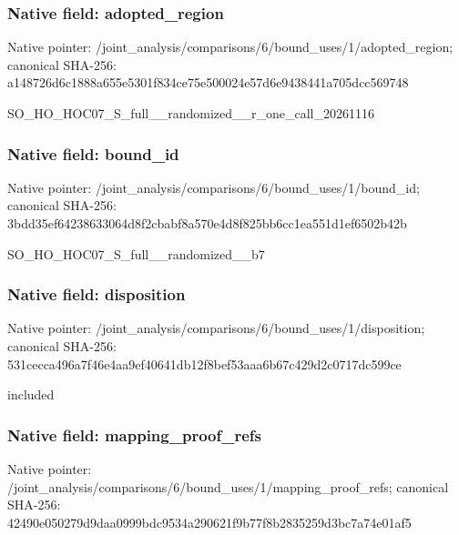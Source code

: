 \documentclass[10pt,a4paper]{article}
\begin{document}
\subsubsection{Native field: adopted\_\allowbreak{}region}
Native pointer: /joint\_\allowbreak{}analysis/comparisons/6/bound\_\allowbreak{}uses/1/adopted\_\allowbreak{}region; canonical SHA-256: a148726d6c1888a655e5301f834ce75e500024e57d6e9438441a705dcc569748

\begingroup\raggedright\sloppy SO\_\allowbreak{}HO\_\allowbreak{}HOC07\_\allowbreak{}S\_\allowbreak{}full\_\allowbreak{}\_\allowbreak{}randomized\_\allowbreak{}\_\allowbreak{}r\_\allowbreak{}one\_\allowbreak{}call\_\allowbreak{}20261116\par\endgroup

\subsubsection{Native field: bound\_\allowbreak{}id}
Native pointer: /joint\_\allowbreak{}analysis/comparisons/6/bound\_\allowbreak{}uses/1/bound\_\allowbreak{}id; canonical SHA-256: 3bdd35ef64238633064d8f2cbabf8a570e4d8f825bb6cc1ea551d1ef6502b42b

\begingroup\raggedright\sloppy SO\_\allowbreak{}HO\_\allowbreak{}HOC07\_\allowbreak{}S\_\allowbreak{}full\_\allowbreak{}\_\allowbreak{}randomized\_\allowbreak{}\_\allowbreak{}b7\par\endgroup

\subsubsection{Native field: disposition}
Native pointer: /joint\_\allowbreak{}analysis/comparisons/6/bound\_\allowbreak{}uses/1/disposition; canonical SHA-256: 531cecca496a7f46e4aa9ef40641db12f8bef53aaa6b67c429d2c0717dc599ce

\begingroup\raggedright\sloppy included\par\endgroup

\subsubsection{Native field: mapping\_\allowbreak{}proof\_\allowbreak{}refs}
Native pointer: /joint\_\allowbreak{}analysis/comparisons/6/bound\_\allowbreak{}uses/1/mapping\_\allowbreak{}proof\_\allowbreak{}refs; canonical SHA-256: 42490e050279d9daa0999bdc9534a290621f9b77f8b2835259d3bc7a74e01af5
\end{document}
